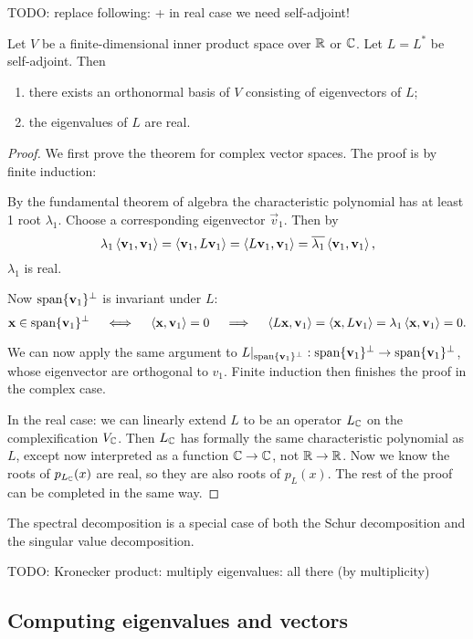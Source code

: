 TODO: replace following: + in real case we need self-adjoint!
\begin{theorem}
Let $V$ be a finite-dimensional inner product space over $\mathbb{R}$ or $\mathbb{C}$. Let $L=L^*$ be self-adjoint. Then
\begin{enumerate}
\item there exists an orthonormal basis of $V$ consisting of eigenvectors of $L$;
\item the eigenvalues of $L$ are real.
\end{enumerate}
\end{theorem}
\begin{proof}
We first prove the theorem for complex vector spaces. The proof is by finite induction:

By the fundamental theorem of algebra the characteristic polynomial has at least 1 root $\lambda_1$. Choose a corresponding eigenvector $\vec{v}_1$. Then by
\[ \lambda_1\left\langle \boldsymbol{\mathrm{v}}_1,\boldsymbol{\mathrm{v}}_1 \right\rangle = \left\langle \boldsymbol{\mathrm{v}}_1, L\boldsymbol{\mathrm{v}}_1 \right\rangle = \left\langle L\boldsymbol{\mathrm{v}}_1, \boldsymbol{\mathrm{v}}_1 \right\rangle = \overline{\lambda_1}\left\langle \boldsymbol{\mathrm{v}}_1, \boldsymbol{\mathrm{v}}_1 \right\rangle, \]
$\lambda_1$ is real.

Now $\operatorname{span}\{\boldsymbol{\mathrm{v}}_1\}^\perp$ is invariant under $L$:
\[ \boldsymbol{\mathrm{x}}\in \operatorname{span}\{\boldsymbol{\mathrm{v}}_1\}^\perp \quad\iff\quad \left\langle \boldsymbol{\mathrm{x}},\boldsymbol{\mathrm{v}}_1 \right\rangle = 0 \quad\implies\quad \left\langle L\boldsymbol{\mathrm{x}},\boldsymbol{\mathrm{v}}_1 \right\rangle = \left\langle \boldsymbol{\mathrm{x}},L\boldsymbol{\mathrm{v}}_1 \right\rangle = \lambda_1\left\langle \boldsymbol{\mathrm{x}},\boldsymbol{\mathrm{v}}_1 \right\rangle = 0. \]

We can now apply the same argument to $L|_{\operatorname{span}\{\boldsymbol{\mathrm{v}}_1\}^\perp}:\operatorname{span}\{\boldsymbol{\mathrm{v}}_1\}^\perp\to \operatorname{span}\{\boldsymbol{\mathrm{v}}_1\}^\perp$, whose eigenvector are orthogonal to $v_1$. Finite induction then finishes the proof in the complex case. 

In the real case: we can linearly extend $L$ to be an operator $L_{\mathbb{C}}$ on the complexification $V_{\mathbb{C}}$. Then $L_{\mathbb{C}}$ has formally the same characteristic polynomial as $L$, except now interpreted as a function $\mathbb{C}\to\mathbb{C}$, not $\mathbb{R}\to\mathbb{R}$. Now we know the roots of $p_{L_{\mathbb{C}}}(x)$ are real, so they are also roots of $p_L(x)$. The rest of the proof can be completed in the same way. 
\end{proof}

The spectral decomposition is a special case of both the Schur decomposition and the singular value decomposition.

TODO: Kronecker product: multiply eigenvalues: all there (by multiplicity)

\subsection{Computing eigenvalues and vectors}
